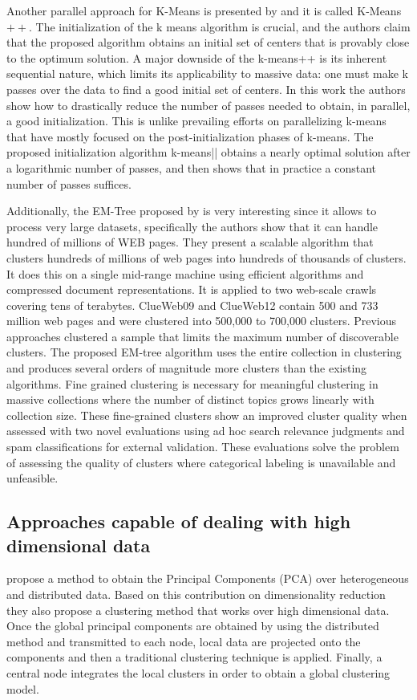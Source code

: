 \documentclass[a4paper]{article}
\begin{document}
Another parallel approach for K-Means is presented by \cite{BMVKV12} and it is called K-Means$++$. The initialization of the k means algorithm is crucial, and the authors claim that the proposed algorithm obtains an initial set of centers that is provably close to the optimum solution. A major downside of the k-means++ is its inherent sequential nature, which limits its applicability to massive data: one must make k passes over the data to find a good initial set of centers. In this work the authors show how to drastically reduce the number of passes needed to obtain, in parallel, a good initialization. This is unlike prevailing efforts on parallelizing k-means that have mostly focused on the post-initialization phases of k-means. The proposed initialization algorithm k-means|| obtains a nearly optimal solution after a logarithmic number of passes, and then shows that in practice a constant number of passes suffices. 

Additionally, the EM-Tree proposed by \cite{VVGN15} is very interesting since it allows to process very large datasets, specifically the authors show that it can handle hundred of millions of WEB pages. They present a scalable algorithm that clusters hundreds of millions of web pages into hundreds of thousands of clusters. It does this on a single mid-range machine using efficient algorithms and compressed document representations. It is applied to two web-scale crawls covering tens of terabytes. ClueWeb09 and ClueWeb12 contain 500 and 733 million web pages and were clustered into 500,000 to 700,000 clusters. Previous approaches clustered a sample that limits the maximum number of discoverable clusters. The proposed EM-tree algorithm uses the entire collection in clustering and produces several orders of magnitude more clusters than the existing algorithms. Fine grained clustering is necessary for meaningful clustering in massive collections where the number of distinct topics grows linearly with collection size. These fine-grained clusters show an improved cluster quality when assessed with two novel evaluations using ad hoc search relevance judgments and spam classifications for external validation. These evaluations solve the problem of assessing the quality of clusters where categorical labeling is unavailable and unfeasible.

\subsection{Approaches capable of dealing with high dimensional data} 
\cite{KHSJ01} propose a method to obtain the Principal Components (PCA) over heterogeneous and distributed data. Based on this contribution on dimensionality reduction they also propose a clustering method that works over high dimensional data. Once the global principal components are obtained by using the distributed method and transmitted to each node, local data are projected onto the components and then a traditional clustering technique is applied. Finally, a central node integrates the local clusters in order to obtain a global clustering model.
\end{document}
